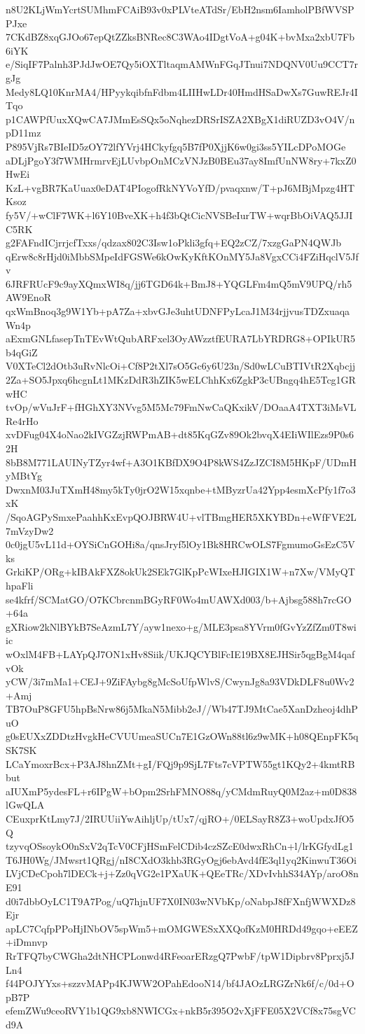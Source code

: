 n8U2KLjWmYcrtSUMhmFCAiB93v0xPLVteATdSr/EbH2nsm6IamholPBfWVSPPJxe
7CKdBZ8xqGJOo67epQtZZksBNRec8C3WAo4IDgtVoA+g04K+bvMxa2xbU7Fb6iYK
e/SiqIF7Palnh3PJdJwOE7Qy5iOXTltaqmAMWnFGqJTnui7NDQNV0Uu9CCT7rgJg
Medy8LQ10KnrMA4/HPyykqibfnFdbm4LIIHwLDr40HmdHSaDwXs7GuwREJr4ITqo
p1CAWPfUuxXQwCA7JMmEsSQx5oNqhezDRSrISZA2XBgX1diRUZD3vO4V/npD11mz
P895VjRs7BIeID5zOY72lfYVrj4HCkyfgq5B7fP0XjjK6w0gi3ss5YILcDPoMOGe
aDLjPgoY3f7WMHrmrvEjLUvbpOnMCzVNJzB0BEu37ay8ImfUnNW8ry+7kxZ0HwEi
KzL+vgBR7KaUuax0eDAT4PIogofRkNYVoYfD/pvaqxnw/T+pJ6MBjMpzg4HTKsoz
fy5V/+wClF7WK+l6Y10BveXK+h4f3bQtCicNVSBeIurTW+wqrBbOiVAQ5JJIC5RK
g2FAFndICjrrjcfTxxs/qdzax802C3Isw1oPkli3gfq+EQ2zCZ/7xzgGaPN4QWJb
qErw8c8rHjd0iMbbSMpeIdFGSWe6kOwKyKftKOnMY5Ja8VgxCCi4FZiHqclV5Jfv
6JRFRUcF9c9ayXQmxWI8q/jj6TGD64k+BmJ8+YQGLFm4mQ5mV9UPQ/rh5AW9EnoR
qxWmBnoq3g9W1Yb+pA7Za+xbvGJe3uhtUDNFPyLcaJ1M34rjjvusTDZxuaqaWn4p
aExmGNLfasepTnTEvWtQubARFxel3OyAWzztfEURA7LbYRDRG8+OPIkUR5b4qGiZ
V0XTeCl2dOtb3uRvNlcOi+Cf8P2tXl7sO5Gc6y6U23n/Sd0wLCuBTIVtR2Xqbcjj
2Za+SO5Jpxq6hcgnLt1MKzDdR3hZIK5wELChhKx6ZgkP3cUBngq4hE5Tcg1GRwHC
tvOp/wVuJrF+fHGhXY3NVvg5M5Mc79FmNwCaQKxikV/DOaaA4TXT3iMsVLRe4rHo
xvDFug04X4oNao2kIVGZzjRWPmAB+dt85KqGZv89Ok2bvqX4EIiWIlEzs9P0s62H
8bB8M771LAUINyTZyr4wf+A3O1KBfDX9O4P8kWS4ZzJZCI8M5HKpF/UDmHyMBtYg
DwxnM03JuTXmH48my5kTy0jrO2W15xqnbe+tMByzrUa42Ypp4esmXcPfy1f7o3xK
/SqoAGPySmxePaahhKxEvpQOJBRW4U+vlTBmgHER5XKYBDn+eWfFVE2L7mVzyDw2
0c0jgU5vL11d+OYSiCnGOHi8a/qnsJryf5lOy1Bk8HRCwOLS7FgmumoGsEzC5Vks
GrkiKP/ORg+kIBAkFXZ8okUk2SEk7GlKpPcWIxeHJIGIX1W+n7Xw/VMyQThpaFli
se4kfrf/SCMatGO/O7KCbrcnmBGyRF0Wo4mUAWXd003/b+Ajbsg588h7rcGO+64a
gXRiow2kNlBYkB7SeAzmL7Y/ayw1nexo+g/MLE3psa8YVrm0fGvYzZfZm0T8wiic
wOxlM4FB+LAYpQJ7ON1xHv8Siik/UKJQCYBlFcIE19BX8EJHSir5qgBgM4qafvOk
yCW/3i7mMa1+CEJ+9ZiFAybg8gMcSoUfpWlvS/CwynJg8a93VDkDLF8u0Wv2+Amj
TB7OuP8GFU5hpBsNrw86j5MkaN5Mibb2eJ//Wb47TJ9MtCae5XanDzheoj4dhPuO
g0sEUXxZDDtzHvgkHeCVUUmeaSUCn7E1GzOWn88tl6z9wMK+h08QEnpFK5qSK7SK
LCaYmoxrBcx+P3AJ8hnZMt+gI/FQj9p9SjL7Fts7cVPTW55gt1KQy2+4kmtRBbut
aIUXmP5ydesFL+r6IPgW+bOpm2SrhFMNO88q/yCMdmRuyQ0M2az+m0D838lGwQLA
CEuxprKtLmy7J/2IRUUiiYwAihljUp/tUx7/qjRO+/0ELSayR8Z3+woUpdxJfO5Q
tzyvqOSsoykO0nSxV2qTcV0CFjHSmFelCDib4czSZcE0dwxRhCn+l/lrKGfydLg1
T6JH0Wg/JMwsrt1QRgj/nI8CXdO3khb3RGyOgj6ebAvd4fE3ql1yq2KinwuT36Oi
LVjCDeCpoh7lDECk+j+Zz0qVG2e1PXaUK+QEeTRc/XDvIvhhS34AYp/aroO8nE91
d0i7dbbOyLC1T9A7Pog/uQ7hjnUF7X0IN03wNVbKp/oNabpJ8fFXnfjWWXDz8Ejr
apLC7CqfpPPoHjINbOV5spWm5+mOMGWESxXXQofKzM0HRDd49gqo+eEEZ+iDmnvp
RrTFQ7byCWGha2dtNHCPLonwd4RFeoarERzgQ7PwbF/tpW1Dipbrv8Pprxj5JLn4
f44POJYYxs+szzvMAPp4KJWW2OPahEdooN14/bf4JAOzLRGZrNk6f/c/0d+OpB7P
efemZWu9ceoRVY1b1QG9xb8NWICGx+nkB5r395O2vXjFFE05X2VCf8x75sgVCd9A
